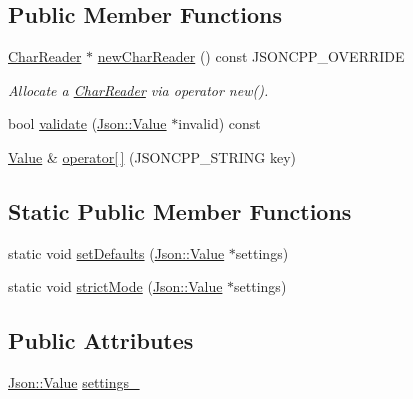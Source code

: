 \subsection*{Public Member Functions}
\begin{DoxyCompactItemize}
\item 
\hyperlink{classJson_1_1CharReader}{Char\+Reader} $\ast$ \hyperlink{classJson_1_1CharReaderBuilder_a3a262fcc76c1eb8eebfd4718fb4e9722}{new\+Char\+Reader} () const J\+S\+O\+N\+C\+P\+P\+\_\+\+O\+V\+E\+R\+R\+I\+DE
\begin{DoxyCompactList}\small\item\em Allocate a \hyperlink{classJson_1_1CharReader}{Char\+Reader} via operator new(). \end{DoxyCompactList}\item 
bool \hyperlink{classJson_1_1CharReaderBuilder_af890b5cb70e9b372e41de5c9e6535d21}{validate} (\hyperlink{classJson_1_1Value}{Json\+::\+Value} $\ast$invalid) const
\item 
\hyperlink{classJson_1_1Value}{Value} \& \hyperlink{classJson_1_1CharReaderBuilder_a84b35ef443340c06c0aa7b47851d8d86}{operator\mbox{[}$\,$\mbox{]}} (J\+S\+O\+N\+C\+P\+P\+\_\+\+S\+T\+R\+I\+NG key)
\end{DoxyCompactItemize}
\subsection*{Static Public Member Functions}
\begin{DoxyCompactItemize}
\item 
static void \hyperlink{classJson_1_1CharReaderBuilder_a03ff031e06aabff989ab4addc87294ab}{set\+Defaults} (\hyperlink{classJson_1_1Value}{Json\+::\+Value} $\ast$settings)
\item 
static void \hyperlink{classJson_1_1CharReaderBuilder_a9c19e3c5475f9072d527810d4bf56749}{strict\+Mode} (\hyperlink{classJson_1_1Value}{Json\+::\+Value} $\ast$settings)
\end{DoxyCompactItemize}
\subsection*{Public Attributes}
\begin{DoxyCompactItemize}
\item 
\hyperlink{classJson_1_1Value}{Json\+::\+Value} \hyperlink{classJson_1_1CharReaderBuilder_ac69b7911ad64c171c51ebaf2ea26d958}{settings\+\_\+}
\end{DoxyCompactItemize}


